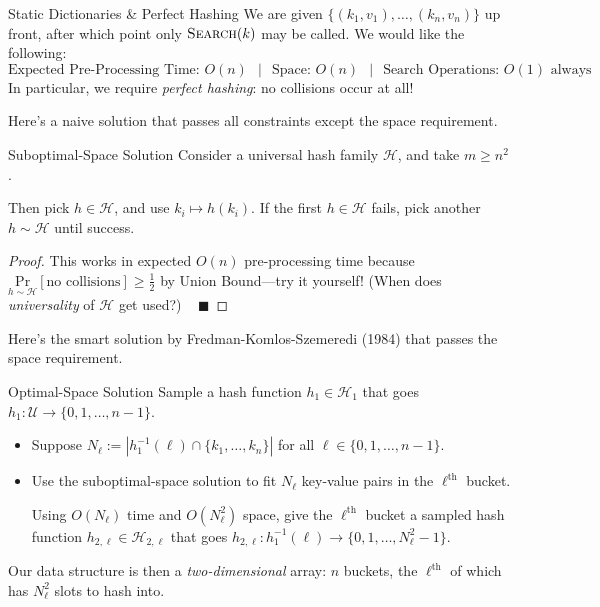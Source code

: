 \begin{problem}{Static Dictionaries \& Perfect Hashing}
    We are given $\{(k_1, v_1), \dots, (k_n, v_n)\}$ up front, after which point only $\textsc{Search}(k)$ may be called.  We would like the following:
    \[ \text{Expected Pre-Processing Time: } O(n) ~~ \mid ~~ \text{Space: } O(n) ~~ \mid ~~ \text{Search Operations: } O(1) \text{ always} \]
    In particular, we require \emph{perfect hashing}: no collisions occur at all!
\end{problem}

Here's a naive solution that passes all constraints except the space requirement.

\begin{solution}{Suboptimal-Space Solution}
    Consider a universal hash family $\mathcal{H}$, and take $m \geq n^2$.

    Then pick $h \in \mathcal{H}$, and use $k_i \mapsto h(k_i)$.  If the first $h \in \mathcal{H}$ fails, pick another $h \sim \mathcal{H}$ until success.
\end{solution}

\begin{proof}
    This works in expected $O(n)$ pre-processing time because $\underset{h \sim \mathcal{H}}{\mathrm{Pr}}[\text{no collisions}] \geq \frac{1}{2}$ by Union Bound---try it yourself!  (When does \emph{universality} of $\mathcal{H}$ get used?) ~ $\blacksquare$
\end{proof}

Here's the smart solution by Fredman-Komlos-Szemeredi (1984) that passes the space requirement.

\begin{solution}{Optimal-Space Solution}
    Sample a hash function $h_1 \in \mathcal{H}_1$ that goes $h_1: \mathcal{U} \to \{0, 1, \dots, n - 1\}$.
    \begin{itemize}
        \item Suppose $N_{\ell} := |h_1^{-1}(\ell) \cap \{k_1, \dots, k_n\}|$ for all $\ell \in \{0, 1, \dots, n - 1\}$.
        \item Use the suboptimal-space solution to fit $N_{\ell}$ key-value pairs in the $\ell^{\text{th}}$ bucket.
        
        Using $O(N_{\ell})$ time and $O(N_{\ell}^2)$ space, give the $\ell^{\text{th}}$ bucket a sampled hash function $h_{2, \ell} \in \mathcal{H}_{2, \ell}$ that goes $h_{2, \ell}: h_1^{-1}(\ell) \to \{0, 1, \dots, N_{\ell}^2 - 1\}$.
    \end{itemize}
    Our data structure is then a \emph{two-dimensional} array: $n$ buckets, the $\ell^{\text{th}}$ of which has $N_{\ell}^2$ slots to hash into.
\end{solution}

